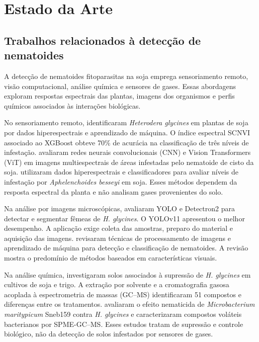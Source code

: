 
\section{Estado da Arte}
\label{sec:estado_arte}

\subsection{Trabalhos relacionados à detecção de nematoides}
\label{subsec:trabalhos_nematoides}

A detecção de nematoides fitoparasitas na soja emprega sensoriamento remoto,
visão computacional, análise química e sensores de gases. Essas abordagens
exploram respostas espectrais das plantas, imagens dos organismos e perfis
químicos associados às interações biológicas.

No sensoriamento remoto, \cite{wang2025scn} identificaram \textit{Heterodera
glycines} em plantas de soja por dados hiperespectrais e aprendizado de
máquina. O índice espectral SCNVI associado ao XGBoost obteve 70\% de acurácia
na classificação de três níveis de infestação. \cite{katari2026} avaliaram
redes neurais convolucionais (CNN) e Vision Transformers (ViT) em imagens
multiespectrais de áreas infestadas pelo nematoide de cisto da soja.
\cite{dellasilva2025} utilizaram dados hiperespectrais e classificadores para
avaliar níveis de infestação por \textit{Aphelenchoides besseyi} em soja. Esses
métodos dependem da resposta espectral da planta e não analisam gases
provenientes do solo.

Na análise por imagens microscópicas, \cite{park2026} avaliaram YOLO e
Detectron2 para detectar e segmentar fêmeas de \textit{H. glycines}. O YOLOv11
apresentou o melhor desempenho. A aplicação exige coleta das amostras, preparo
do material e aquisição das imagens. \cite{neupane2025} revisaram técnicas de
processamento de imagens e aprendizado de máquina para detecção e classificação
de nematoides. A revisão mostra o predomínio de métodos baseados em
características visuais.

Na análise química, \cite{rocha2023} investigaram solos associados à supressão
de \textit{H. glycines} em cultivos de soja e trigo. A extração por solvente e
a cromatografia gasosa acoplada à espectrometria de massas (GC--MS)
identificaram 51 compostos e diferenças entre os tratamentos. \cite{zhao2025}
avaliaram o efeito nematicida de \textit{Microbacterium maritypicum} Sneb159
contra \textit{H. glycines} e caracterizaram compostos voláteis bacterianos por
SPME-GC--MS. Esses estudos tratam de supressão e controle biológico, não da
detecção de solos infestados por sensores de gases.


